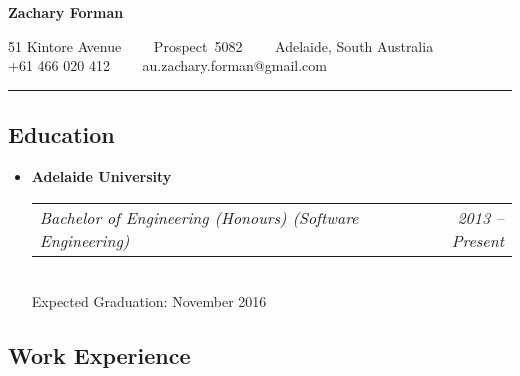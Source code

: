 \documentclass[10pt,letterpaper]{article}
\makeatletter
\newcommand{\headerrow}[2]
{\begin{tabular*}{\linewidth}{l@{\extracolsep{\fill}}r}
  #1 &
  #2 \\
\end{tabular*}}
\makeatother
\begin{document}
\begin{center}
{\LARGE \textbf{Zachary Forman}}

51 Kintore Avenue\ \ \textbullet
\ \ Prospect\ 5082\ \ \textbullet
\ \ Adelaide, South Australia
\\
+61 466 020 412\ \ \textbullet
\ \ au.zachary.forman@gmail.com
\end{center}

\hrule
\vspace{-0.4em}
\subsection*{Education}

\begin{itemize}
  \parskip=0.1em

  \item
  {\textbf{Adelaide University}}
  \\
  \headerrow
    {\emph{Bachelor of Engineering (Honours) (Software Engineering)}}
    {\emph{2013 -- Present}}
  \\
  Expected Graduation: November 2016

\end{itemize}

\subsection*{Work Experience}
\end{document}
